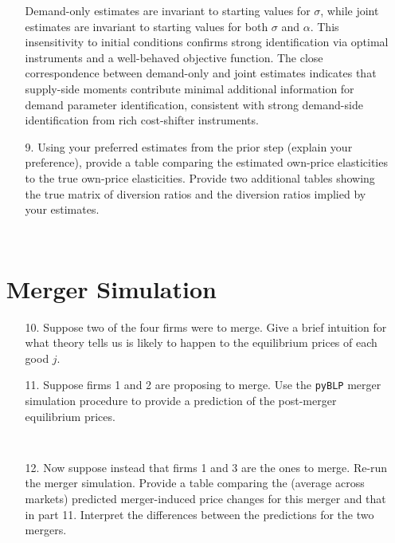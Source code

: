 \documentclass[english,11pt]{article}
\begin{document}
\begin{enumerate}
\begin{enumerate}
Demand-only estimates are invariant to starting values for $\sigma$, while joint estimates are invariant to starting values for both $\sigma$ and $\alpha$. This insensitivity to initial conditions confirms strong identification via optimal instruments and a well-behaved objective function. The close correspondence between demand-only and joint estimates indicates that supply-side moments contribute minimal additional information for demand parameter identification, consistent with strong demand-side identification from rich cost-shifter instruments.

\item[9.] Using your preferred estimates from the prior step (explain your
preference), provide a table comparing the estimated own-price elasticities
to the true own-price elasticities. Provide two additional tables showing
the true matrix of diversion ratios and the diversion ratios implied by your
estimates.

\begin{verbatim}
    
\end{verbatim}

\end{enumerate}

\section{Merger Simulation}

\begin{enumerate}
\item[10.] Suppose two of the four firms were to merge. Give a brief
intuition for what theory tells us is likely to happen to the equilibrium
prices of each good $j$.



\item[11.] Suppose firms 1 and 2 are proposing to merge. Use the \texttt{pyBLP}
merger simulation procedure to provide a prediction of the post-merger
equilibrium prices.

\begin{verbatim}
    
\end{verbatim}

\item[12.] Now suppose instead that firms 1 and 3 are the ones to merge.
Re-run the merger simulation. Provide a table comparing the (average
across markets) predicted merger-induced price changes for this merger and
that in part 11. Interpret the differences between the predictions for the
two mergers.


\end{enumerate}
\end{enumerate}
\end{document}

